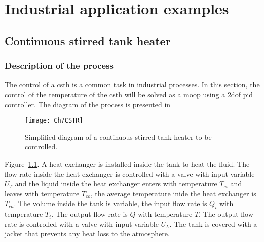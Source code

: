 \chapter{Industrial application examples}
\label{chap:ApplicationExamples}
%
%

%
\section{Continuous stirred tank heater}
\label{sec:CSTH}
%
\subsection{Description of the process}
\label{sec:Description}
%
The control of a \gls{csth} is a common task in industrial processes. In this section, the control of the temperature of the \gls{csth} will be solved as a \gls{moop} using a \gls{2dof} \gls{pid} controller. The diagram of the process is presented in %
\begin{figure}[b]
	\centering
	\texttt{[image: Ch7CSTR]}
	\caption{Simplified diagram of a continuous stirred-tank heater to be controlled.}
	\label{fig:Ch7CSTR}
\end{figure}
Figure~\ref{fig:Ch7CSTR}. A heat exchanger is installed inside the tank to heat the fluid. The flow rate inside the heat exchanger is controlled with a valve with input variable $U_T$ and the liquid inside the heat exchanger enters with temperature $T_{ci}$ and leaves with temperature $T_{co}$, the average temperature inide the heat exchanger is $T_{ca}$. The volume inside the tank is variable, the input flow rate is $Q_i$ with temperature $T_i$. The output flow rate is $Q$ with temperature $T$. The output flow rate is controlled with a valve with input variable $U_L$. The tank is covered with a jacket that prevents any heat loss to the atmosphere.

